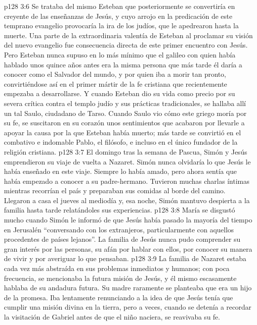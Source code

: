 \vs p128 3:6 Se trataba del mismo Esteban que posteriormente se convertiría en creyente de las enseñanzas de Jesús, y cuyo arrojo en la predicación de este temprano evangelio provocaría la ira de los judíos, que le apedrearon hasta la muerte. Una parte de la extraordinaria valentía de Esteban al proclamar su visión del nuevo evangelio fue consecuencia directa de este primer encuentro con Jesús. Pero Esteban nunca supuso en lo más mínimo que el galileo con quien había hablado unos quince años antes era la misma persona que más tarde él daría a conocer como el Salvador del mundo, y por quien iba a morir tan pronto, convirtiéndose así en el primer mártir de la fe cristiana que recientemente empezaba a desarrollarse. Y cuando Esteban dio su vida como precio por su severa crítica contra el templo judío y sus prácticas tradicionales, se hallaba allí un tal Saulo, ciudadano de Tarso. Cuando Saulo vio cómo este griego moría por su fe, se suscitaron en su corazón unos sentimientos que acabaron por llevarle a apoyar la causa por la que Esteban había muerto; más tarde se convirtió en el combativo e indomable Pablo, el filósofo, e incluso en el único fundador de la religión cristiana.
\vs p128 3:7 \pc El domingo tras la semana de Pascua, Simón y Jesús emprendieron su viaje de vuelta a Nazaret. Simón nunca olvidaría lo que Jesús le había enseñado en este viaje. Siempre lo había amado, pero ahora sentía que había empezado a conocer a su padre\hyp{}hermano. Tuvieron muchas charlas íntimas mientras recorrían el país y preparaban sus comidas al borde del camino. Llegaron a casa el jueves al mediodía y, esa noche, Simón mantuvo despierta a la familia hasta tarde relatándoles sus experiencias.
\vs p128 3:8 María se disgustó mucho cuando Simón le informó de que Jesús había pasado la mayoría del tiempo en Jerusalén “conversando con los extranjeros, particularmente con aquellos procedentes de países lejanos”. La familia de Jesús nunca pudo comprender su gran interés por las personas, su afán por hablar con ellos, por conocer su manera de vivir y por averiguar lo que pensaban.
\vs p128 3:9 \pc La familia de Nazaret estaba cada vez más abstraída en sus problemas inmediatos y humanos; con poca frecuencia, se mencionaba la futura misión de Jesús, y él mismo escasamente hablaba de su andadura futura. Su madre raramente se planteaba que era un hijo de la promesa. Iba lentamente renunciando a la idea de que Jesús tenía que cumplir una misión divina en la tierra, pero a veces, cuando se detenía a recordar la visitación de Gabriel antes de que el niño naciera, se reavivaba su fe.
